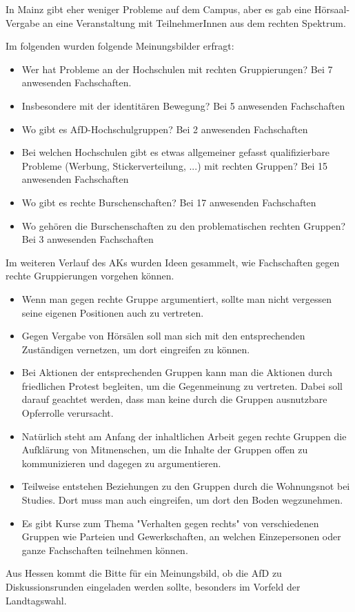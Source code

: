 In Mainz gibt eher weniger Probleme auf dem Campus, aber es gab eine Hörsaal-Vergabe an eine Veranstaltung mit TeilnehmerInnen aus dem rechten Spektrum. 

Im folgenden wurden folgende Meinungsbilder erfragt:
\begin{itemize}
\item Wer hat Probleme an der Hochschulen mit rechten Gruppierungen? Bei 7 anwesenden Fachschaften.
\item Insbesondere mit der identitären Bewegung? Bei 5 anwesenden Fachschaften
\item Wo gibt es AfD-Hochschulgruppen? Bei 2 anwesenden Fachschaften
\item Bei welchen Hochschulen gibt es etwas allgemeiner gefasst qualifizierbare Probleme (Werbung, Stickerverteilung, ...) mit rechten Gruppen? Bei 15 anwesenden Fachschaften
\item Wo gibt es rechte Burschenschaften? Bei 17 anwesenden Fachschaften
\item Wo gehören die Burschenschaften zu den problematischen rechten Gruppen? Bei 3 anwesenden Fachschaften
\end{itemize}

Im weiteren Verlauf des AKs wurden Ideen gesammelt, wie Fachschaften gegen rechte Gruppierungen vorgehen können.

\begin{itemize}
\item Wenn man gegen rechte Gruppe argumentiert, sollte man nicht vergessen seine eigenen Positionen auch zu vertreten.
\item Gegen Vergabe von Hörsälen soll man sich mit den entsprechenden Zuständigen vernetzen, um dort eingreifen zu können.
\item Bei Aktionen der entsprechenden Gruppen kann man die Aktionen durch friedlichen Protest begleiten, um die Gegenmeinung zu vertreten. Dabei soll darauf geachtet werden, dass man keine durch die Gruppen ausnutzbare Opferrolle verursacht.
\item Natürlich steht am Anfang der inhaltlichen Arbeit gegen rechte Gruppen die Aufklärung von Mitmenschen, um die Inhalte der Gruppen offen zu kommunizieren und dagegen zu argumentieren.
\item Teilweise entstehen Beziehungen zu den Gruppen durch die Wohnungsnot bei Studies. Dort muss man auch eingreifen, um dort den Boden wegzunehmen.
\item Es gibt Kurse zum Thema "Verhalten gegen rechts" von verschiedenen Gruppen wie Parteien und Gewerkschaften, an welchen Einzepersonen oder ganze Fachschaften teilnehmen können.
\end{itemize}
Aus Hessen kommt die Bitte für ein Meinungsbild, ob die AfD zu Diskussionsrunden eingeladen werden sollte, besonders im Vorfeld der Landtagswahl.

